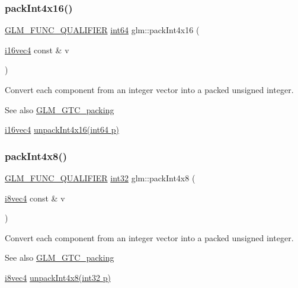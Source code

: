 \subsubsection{\texorpdfstring{pack\+Int4x16()}{packInt4x16()}}
{\footnotesize\ttfamily \hyperlink{setup_8hpp_a33fdea6f91c5f834105f7415e2a64407}{G\+L\+M\+\_\+\+F\+U\+N\+C\+\_\+\+Q\+U\+A\+L\+I\+F\+I\+ER} \hyperlink{group__gtc__type__precision_ga435d75819cce297cc5fa21bd84ef89a5}{int64} glm\+::pack\+Int4x16 (\begin{DoxyParamCaption}\item[{\hyperlink{group__gtc__type__precision_ga99a249a4cc129cb527c48d3afd38b666}{i16vec4} const \&}]{v }\end{DoxyParamCaption})}

Convert each component from an integer vector into a packed unsigned integer.

\begin{DoxySeeAlso}{See also}
\hyperlink{group__gtc__packing}{G\+L\+M\+\_\+\+G\+T\+C\+\_\+packing} 

\hyperlink{group__gtc__type__precision_ga99a249a4cc129cb527c48d3afd38b666}{i16vec4} \hyperlink{group__gtc__packing_ga625619888b95299a1ee0d9e50469c482}{unpack\+Int4x16(int64 p)} 
\end{DoxySeeAlso}
\mbox{\label{group__gtc__packing_gac04277b39f9ca1ae2ca4840a3cb987e8}} 
\subsubsection{\texorpdfstring{pack\+Int4x8()}{packInt4x8()}}
{\footnotesize\ttfamily \hyperlink{setup_8hpp_a33fdea6f91c5f834105f7415e2a64407}{G\+L\+M\+\_\+\+F\+U\+N\+C\+\_\+\+Q\+U\+A\+L\+I\+F\+I\+ER} \hyperlink{group__gtc__type__precision_ga632d8b25f6b61659f39ea4321fab92a4}{int32} glm\+::pack\+Int4x8 (\begin{DoxyParamCaption}\item[{\hyperlink{group__gtc__type__precision_gaaad99cfb998ddcb74e9c33d0149fdd0e}{i8vec4} const \&}]{v }\end{DoxyParamCaption})}

Convert each component from an integer vector into a packed unsigned integer.

\begin{DoxySeeAlso}{See also}
\hyperlink{group__gtc__packing}{G\+L\+M\+\_\+\+G\+T\+C\+\_\+packing} 

\hyperlink{group__gtc__type__precision_gaaad99cfb998ddcb74e9c33d0149fdd0e}{i8vec4} \hyperlink{group__gtc__packing_gaeed27076c5d26f4cca0d06637d3e878c}{unpack\+Int4x8(int32 p)} 
\end{DoxySeeAlso}
\mbox{\label{group__gtc__packing_ga0466daf4c90f76cc64b3f105ce727295}} 
